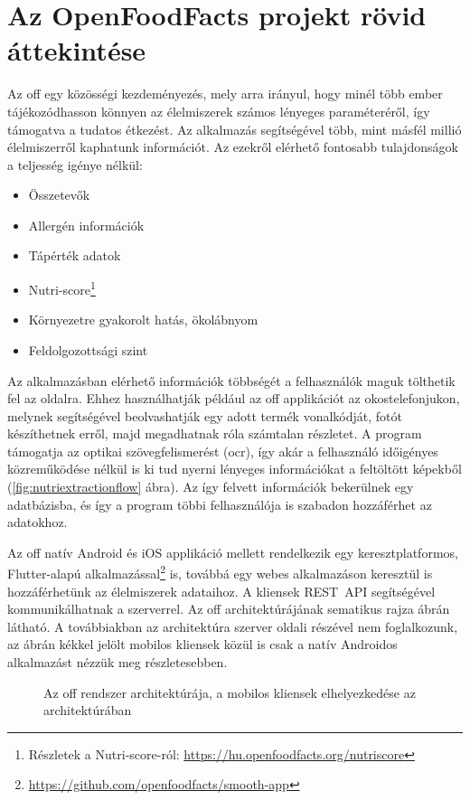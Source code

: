 \chapter{Az OpenFoodFacts projekt rövid áttekintése}

Az \acrlong{off} egy közösségi kezdeményezés, mely arra irányul, hogy minél több ember
tájékozódhasson könnyen az élelmiszerek számos lényeges paraméteréről, így támogatva a
tudatos étkezést. Az alkalmazás segítségével több, mint másfél millió élelmiszerről kaphatunk
információt. Az ezekről elérhető fontosabb tulajdonságok a teljesség igénye nélkül:
\begin{itemize}
 \item Összetevők
 \item Allergén információk
 \item Tápérték adatok
 \item Nutri-score\footnote{Részletek a Nutri-score-ról: \url{https://hu.openfoodfacts.org/nutriscore}}
 \item Környezetre gyakorolt hatás, ökolábnyom
 \item Feldolgozottsági szint
\end{itemize}


Az alkalmazásban elérhető információk többségét a felhasználók maguk tölthetik fel az oldalra.
Ehhez használhatják például az \acrlong{off} applikációt az okostelefonjukon, melynek segítségével
beolvashatják egy adott termék vonalkódját, fotót készíthetnek erről, majd megadhatnak róla számtalan
részletet. A program támogatja az optikai szövegfelismerést (\acrfull{ocr}),
így akár a felhasználó időigényes közreműködése nélkül is ki tud nyerni lényeges információkat a
feltöltött képekből (\ref{fig:nutriextractionflow} ábra). Az így felvett információk bekerülnek egy adatbázisba, és így a program többi
felhasználója is szabadon hozzáférhet az adatokhoz.

Az \acrlong{off} natív Android és iOS applikáció mellett rendelkezik egy keresztplatformos,
Flutter-alapú alkalmazással\footnote{\url{https://github.com/openfoodfacts/smooth-app}} is, továbbá egy webes alkalmazáson keresztül is hozzáférhetünk az
élelmiszerek adataihoz. A kliensek REST~API segítségével kommunikálhatnak a %
szerverrel. Az \acrlong{off} architektúrájának sematikus rajza \az{\ref{fig:offarchitektura}}
ábrán látható. A továbbiakban az architektúra szerver oldali részével nem foglalkozunk, az
ábrán kékkel jelölt mobilos kliensek közül is csak a natív Androidos alkalmazást nézzük meg részletesebben.

\begin{figure}[ht]
\centering

\caption{\centering Az \acrlong{off} rendszer architektúrája, a mobilos kliensek elhelyezkedése az architektúrában}
\label{fig:offarchitektura}
\end{figure}
